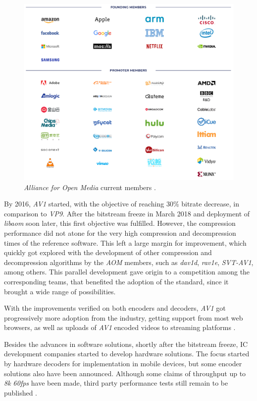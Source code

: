 \begin{figure}[!htbp]
    \centering
    \includegraphics[width=\textwidth]{Sections/2AV1/Diagrams/Images/AOM.png}
    \caption[\emph{Alliance for Open Media} current members]{\emph{Alliance for Open Media} current members \cite{aomediaHome}.} 
    \label{fig:aom}
\end{figure}

By 2016, \emph{AV1} started, with the objective of reaching 30\% bitrate decrease, in comparison to \emph{VP9}. After the bitstream freeze in March 2018 and deployment of \emph{libaom} soon later, this first objective was fulfilled. However, the compression performance did not atone for the very high compression and decompression times of the reference software. This left a large margin for improvement, which quickly got explored with the development of other compression and decompression algorithms by the \emph{AOM} members, such as \emph{dav1d}, \emph{rav1e}, \emph{SVT-AV1},  among others. This parallel development gave origin to a competition among the corresponding teams, that benefited the adoption of the standard, since it brought a wide range of possibilities. 

With the improvements verified on both encoders and decoders, \emph{AV1} got progressively more adoption from the industry, getting support from most web browsers, as well as uploads of \emph{AV1} encoded videos to streaming platforms \cite{eggeLatestTechnicalBusiness2019}.

Besides the advances in software solutions, shortly after the bitstream freeze, IC development companies started to develop hardware solutions. The focus started by hardware decoders for implementation in mobile devices, but some encoder solutions also have been announced. Although some claims of throughput up to \emph{8k 60fps} have been made, third party performance tests still remain to be published \cite{AllegroDVTIntroduces2019,NGCodecAnnouncesAV1, shilovRealtekDemonstratesRTD2893, RealtekLaunchesWorldwide, SocionextImplementsAV12018}.

